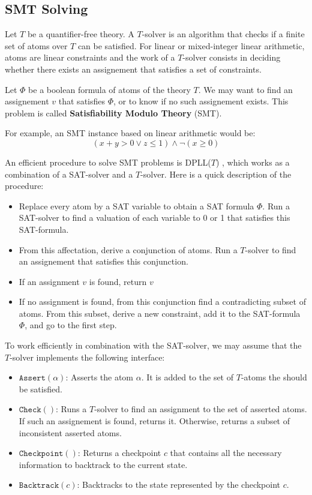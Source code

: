 \documentclass{article}
\newcommand{\iassert}[1]{\mathtt{Assert}(#1)}
\newcommand{\icheck}{\mathtt{Check}()}
\newcommand{\icheckpoint}{\mathtt{Checkpoint}()}
\newcommand{\ibacktrack}[1]{\mathtt{Backtrack}(#1)}
\begin{document}
\subsection{SMT Solving}
\label{smt}
Let $T$ be a quantifier-free theory. A $T$-solver is an algorithm that checks
if a finite set of atoms over $T$ can be satisfied. For linear or mixed-integer
linear arithmetic, atoms are linear constraints and the work of a $T$-solver
consists in deciding whether there exists an assignement
that satisfies a set of constraints.

Let $\Phi$ be a boolean formula of atoms of the theory $T$. We may want to find
an assignement $v$ that satisfies $\Phi$, or to know if no such assignement
exists. This problem is called \textbf{Satisfiability Modulo Theory} (SMT).

For example, an SMT instance based on linear arithmetic would be:
$$(x + y > 0 \vee z \leqslant 1) \wedge \neg (x \geqslant 0)$$

An efficient procedure to solve SMT problems is DPLL($T$)
\cite[Section 3.2]{Decision2016},
which works as a combination of a SAT-solver and a $T$-solver. Here is a quick
description of the procedure:
\begin{itemize}
  \item Replace every atom by a SAT variable to obtain a SAT formula $\Phi$.
    Run a SAT-solver to find a valuation of each variable to 0 or 1 that
    satisfies this SAT-formula.
  \item From this affectation, derive a conjunction of atoms. Run a
    $T$-solver to find an assignement that satisfies this conjunction.
  \item If an assignment $v$ is found, return $v$
  \item If no assignment is found, from this conjunction find a contradicting
    subset of atoms. From this subset, derive a new constraint, add it to the
    SAT-formula $\Phi$, and go to the first step.
\end{itemize}

To work efficiently in combination with the SAT-solver, we may assume that the
$T$-solver implements the following interface:
\begin{itemize}
  \item $\iassert{\alpha}$: Asserts the atom $\alpha$. It is added to the set of
    $T$-atoms the should be satisfied.
  \item $\icheck$: Runs a $T$-solver to find an assignment to the set of
    asserted atoms. If such an assignement is found, returns it. Otherwise,
    returns a subset of inconsistent asserted atoms.
  \item $\icheckpoint$: Returns a checkpoint $c$ that contains all the necessary
    information to backtrack to the current state.
  \item $\ibacktrack{c}$: Backtracks to the state represented by the checkpoint
    $c$.
\end{itemize}
\end{document}
